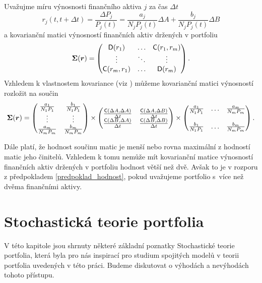 \documentclass[a4paper,12pt]{report}
\theoremstyle{definition} \newtheorem{definice}[veta]{Definice}
\theoremstyle{remark}
\begin{document}
Uvažujme míru výnosnosti finančního aktiva $j$ za čas $\Delta t$
\begin{displaymath}
r_j(t,t+\Delta t)=\frac{\Delta P_j}{P_j(t)}=\frac{a_j}{N_jP_j(t)}\Delta A + \frac{b_j}{N_jP_j(t)}\Delta B
\end{displaymath}
a kovarianční matici výnosností finančních aktiv držených v portfoliu
$$\boldsymbol{\Sigma}(\boldsymbol{r})=
\begin{pmatrix}
\mathsf{D}(r_1)  & \ldots & \mathsf{C}(r_1,r_m)  \cr \vdots & \ddots & \vdots\cr \mathsf{C}(r_m,r_1)   & \ldots & \mathsf{D}(r_m) 
\end{pmatrix}.$$
Vzhledem k vlastnostem kovariance (viz \cite{andel}) můžeme kovarianční matici výnosností rozložit na součin 
$$
\boldsymbol{\Sigma}(\boldsymbol{r})= 
\begin{pmatrix}
\frac{a_1}{N_1P_1} & \frac{b_1}{N_1P_1}\cr \vdots & \vdots\cr \frac{a_m}{N_mP_m} & \frac{b_m}{N_mP_m}
\end{pmatrix}
\times
\begin{pmatrix}
\frac{\mathsf{C}(\Delta A, \Delta A)}{\Delta t} &
\frac{\mathsf{C}(\Delta A, \Delta B)}{\Delta t} \cr
\frac{\mathsf{C}(\Delta B, \Delta A)}{\Delta t} & \frac{\mathsf{C}(\Delta B,
\Delta B)}{\Delta t} 
\end{pmatrix}
\times
\begin{pmatrix}
\frac{a_1}{N_1P_1} & \ldots & \frac{a_m}{N_mP_m}\cr \cr \frac{b_1}{N_1P_1} & \ldots &
\frac{b_m}{N_mP_m}
\end{pmatrix}.
$$

Dále platí, že hodnost součinu matic je menší nebo rovna maximální z hodností matic jeho činitelů.
Vzhledem k tomu nemůže mít kovarianční matice výnosností finančních aktiv držených v portfoliu hodnost větší než dvě.
Avšak to je v rozporu z předpokladem \ref{predpoklad_hodnost}, pokud uvažujeme portfolio s~více než dvěma finančními aktivy.



\section{Stochastická teorie portfolia}
V této kapitole jsou shrnuty některé základní poznatky Stochastické teorie portfolia, která byla pro nás inspirací pro studium spojitých modelů v teorii portfolia uvedených v této práci.
Budeme diskutovat o výhodách a nevýhodách tohoto přístupu.
\end{document}
